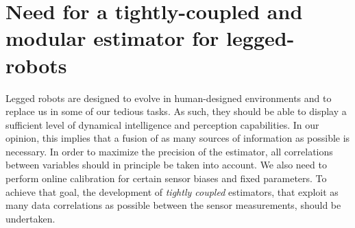 






\section{Need for a tightly-coupled and modular estimator for legged-robots}

Legged robots are designed to evolve in human-designed environments and to replace us in some of our tedious tasks. As such, they should be able to
display a sufficient level of dynamical intelligence and perception capabilities. In our opinion, this implies that a fusion of as many sources of
information as possible is necessary. In order to maximize the precision of the estimator, all correlations between variables should in principle be taken into account. 
We also need to perform online calibration for certain sensor biases and fixed parameters. To achieve that goal, the development of \textit{tightly coupled} estimators, 
that exploit as many data correlations as possible between the sensor measurements, should be undertaken.


